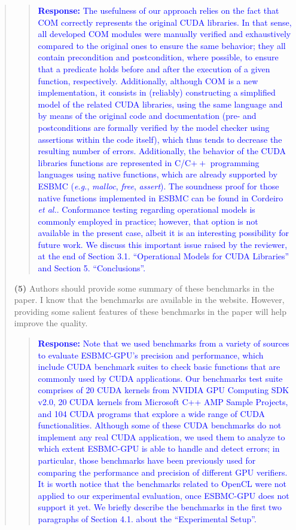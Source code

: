 \documentclass[11pt]{article}
\begin{document}
\begin{quote}
\begin{quote}
\textcolor{blue}{\textbf{Response:} The usefulness of our approach relies on the fact that COM correctly represents the original CUDA libraries. In that sense, all developed COM modules were manually verified and exhaustively compared to the original ones to ensure the same behavior; they all contain precondition and postcondition, where possible, to ensure that a predicate holds before and after the execution of a given function, respectively. Additionally, although COM is a new implementation, it consists in (reliably) constructing a simplified model of the related CUDA libraries, using the same language and by means of the original code and documentation (pre- and postconditions are formally verified by the model checker using assertions within the code itself), which thus tends to decrease the resulting number of errors. Additionally, the behavior of the CUDA libraries functions are represented in C/C$++$ programming languages using native functions, which are already supported by ESBMC ({\it e.g.}, \textit{malloc}, \textit{free}, \textit{assert}). The soundness proof for those native functions implemented in ESBMC can be found in Cordeiro {\it et al.}. Conformance testing regarding operational models is commonly employed in practice; however, that option is not available in the present case, albeit it is an interesting possibility for future work. We discuss this important issue raised by the reviewer, at the end of Section 3.1. ``Operational Models for CUDA Libraries'' and Section 5. ``Conclusions''.}
\end{quote}

{\bf(5)} Authors should provide some summary of these benchmarks in the paper. I know
that the benchmarks are available in the website. However, providing some
salient features of these benchmarks in the paper will help improve the quality.

\begin{quote}
\textcolor{blue}{\textbf{Response:} Note that we used benchmarks from a variety of sources to evaluate ESBMC-GPU's precision and performance, which include CUDA benchmark suites to check basic functions that are commonly used by CUDA applications. Our benchmarks test suite comprises of 20 CUDA kernels from NVIDIA GPU Computing SDK v2.0, 20 CUDA kernels from Microsoft C++ AMP Sample Projects, and 104 CUDA programs that explore a wide range of CUDA functionalities. Although some of these CUDA benchmarks do not implement any real CUDA application, we used them to analyze to which extent ESBMC-GPU is able to handle and detect errors; in particular, those benchmarks have been previously used for comparing the performance and precision of different GPU verifiers. It is worth notice that the benchmarks related to OpenCL were not applied to our experimental evaluation, once ESBMC-GPU does not support it yet. We briefly describe the benchmarks in the first two paragraphs of Section 4.1. about the ``Experimental Setup''.}
\end{quote}


\end{quote}
\end{document}
